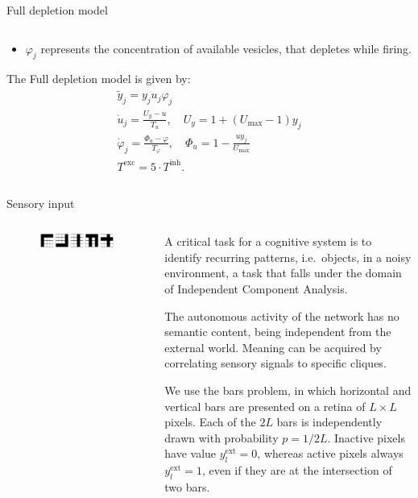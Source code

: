 \documentclass[final,hyperref={pdfpagelabels=false}]{beamer}
\begin{document}
\begin{frame}
\begin{columns}
\begin{column}{.64\textwidth}
\begin{minipage}[T]{.95\textwidth}
{\begin{block}{Full depletion model}
\begin{columns}
\begin{column}[T]{.5\textwidth}
\begin{itemize}
						\item $\varphi_j$ represents the concentration of available vesicles, that depletes while firing.
					\end{itemize}
					The Full depletion model is given by:			
					\begin{gather*}
						\tilde{y}_j = y_j u_j \varphi_j \\
						\dot{u}_j = \frac{U_y -u}{T_u}, \quad U_y = 1 + \left( U_\text{max} -1 \right) y_j\\ 
						\dot{\varphi}_j = \frac{\varPhi_u - \varphi}{T_\varphi}, \quad \varPhi_u = 1- \frac{u y_j}{U_\text{max}} \\
						T^{\text{exc}} = 5 \cdot T^{\text{inh}}.
					\end{gather*}

				\end{column}
			\end{columns}
		\end{block}
		
		\begin{block}{Sensory input}
			\begin{columns}
				\begin{column}[T]{.1\textwidth}
					\begin{figure}[T]
						\includegraphics[width=2.8\textwidth, angle=-90]{input_ex.pdf}									
					\end{figure}
				\end{column}
				
				\begin{column}[T]{.9\textwidth}				
				A critical task for a cognitive system is to identify recurring patterns, i.e.\ objects, in a noisy environment, a task that falls under the domain of Independent Component Analysis.
			
				The autonomous activity of the network has no semantic content, being independent from the external world. Meaning can be acquired by correlating sensory signals to specific cliques.
	
				We use the bars problem, in which horizontal and vertical bars are presented on a retina of $L \times L$ pixels. Each of the $2L$ bars is independently drawn with probability $p=1/2L$. Inactive pixels have value $y_l^{\text{ext}}=0$, whereas active pixels always $y_l^{\text{ext}}=1$, even if they are at the intersection of two bars.
											

\end{column}
\end{columns}
\end{block}}
\end{minipage}
\end{column}
\end{columns}
\end{frame}
\end{document}
